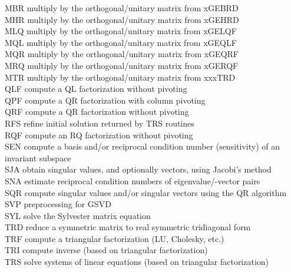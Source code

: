 \begin{tabbing}
MBR \>  multiply by the orthogonal/unitary matrix from xGEBRD \\
MHR \>  multiply by the orthogonal/unitary matrix from xGEHRD \\
MLQ \>  multiply by the orthogonal/unitary matrix from xGELQF \\
MQL \>  multiply by the orthogonal/unitary matrix from xGEQLF \\
MQR \>  multiply by the orthogonal/unitary matrix from xGEQRF \\
MRQ \>  multiply by the orthogonal/unitary matrix from xGERQF \\
MTR \>  multiply by the orthogonal/unitary matrix from xxxTRD \\
QLF \>  compute a QL factorization without pivoting \\
QPF \>  compute a QR factorization with column pivoting\\
QRF \>  compute a QR factorization without pivoting \\
RFS \>  refine initial solution returned by TRS routines \\
RQF \>  compute an RQ factorization without pivoting \\
SEN \>  compute a basis and/or reciprocal condition number (sensitivity) of an \\
    \>  invariant subspace \\
SJA \>  obtain singular values, and optionally vectors, using Jacobi's method \\
SNA \>  estimate reciprocal condition numbers of eigenvalue/-vector pairs\\
SQR \>  compute singular values and/or singular vectors using the QR algorithm \\
SVP \>  preprocessing for GSVD \\
SYL \>  solve the Sylvester matrix equation \\
TRD \>  reduce a symmetric matrix to real symmetric tridiagonal form \\
TRF \>  compute a triangular factorization (LU, Cholesky, etc.) \\
TRI \>  compute inverse (based on triangular factorization)\\
TRS \>  solve systems of linear equations (based on triangular factorization)
\end{tabbing}

